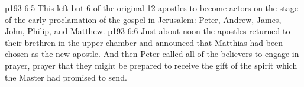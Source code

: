 \vs p193 6:5 This left but 6 of the original 12 apostles to become actors on the stage of the early proclamation of the gospel in Jerusalem: Peter, Andrew, James, John, Philip, and Matthew.
\vs p193 6:6 \pc Just about noon the apostles returned to their brethren in the upper chamber and announced that Matthias had been chosen as the new apostle. And then Peter called all of the believers to engage in prayer, prayer that they might be prepared to receive the gift of the spirit which the Master had promised to send.
